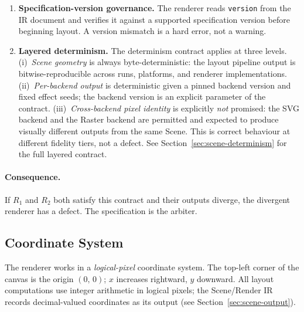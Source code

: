 \begin{enumerate}
  \item \textbf{Specification-version governance.}
        The renderer reads \texttt{version} from the IR document and verifies it against a
        supported specification version before beginning layout. A version mismatch is a
        hard error, not a warning.

  \item \textbf{Layered determinism.}
        The determinism contract applies at three levels. (i)~\emph{Scene geometry} is
        always byte-deterministic: the layout pipeline output is bitwise-reproducible
        across runs, platforms, and renderer implementations. (ii)~\emph{Per-backend
        output} is deterministic given a pinned backend version and fixed effect seeds;
        the backend version is an explicit parameter of the contract.
        (iii)~\emph{Cross-backend pixel identity} is explicitly \emph{not} promised: the
        SVG backend and the Raster backend are permitted and expected to produce visually
        different outputs from the same Scene. This is correct behaviour at different
        fidelity tiers, not a defect. See Section~\ref{sec:scene-determinism} for the
        full layered contract.
\end{enumerate}

\paragraph{Consequence.}
If $R_1$ and $R_2$ both satisfy this contract and their outputs diverge, the divergent
renderer has a defect. The specification is the arbiter.

\subsection{Coordinate System}
\label{sec:rendering-coords}

The renderer works in a \emph{logical-pixel} coordinate system. The top-left corner of
the canvas is the origin $(0,\,0)$; $x$ increases rightward, $y$ downward. All layout
computations use integer arithmetic in logical pixels; the Scene/Render IR records
decimal-valued coordinates as its output (see Section~\ref{sec:scene-output}).

